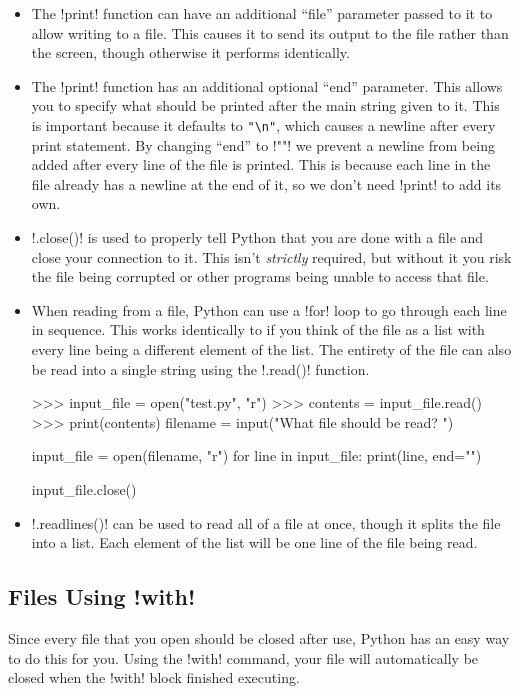 \documentclass[11pt]{cselabheader}
\begin{document}
\begin{itemize}
\item The \pythoninline!print! function can have an additional ``file'' parameter
  passed to it to allow writing to a file. This causes it to send its output to
  the file rather than the screen, though otherwise it performs identically.

\item The \pythoninline!print! function has an additional optional ``end''
  parameter. This allows you to specify what should be printed after the main
  string given to it. This is important because it defaults to \lstinline{"\n"},
  which causes a newline after every print statement. By changing ``end'' to
  \pythoninline!""! we prevent a newline from being added after every line of the
  file is printed. This is because each line in the file already has a newline
  at the end of it, so we don't need \pythoninline!print! to add its own.

\item \pythoninline!.close()! is used to properly tell Python that you are done
  with a file and close your connection to it. This isn't \emph{strictly}
  required, but without it you risk the file being corrupted or other programs
  being unable to access that file.

\item When reading from a file, Python can use a \pythoninline!for! loop to go
  through each line in sequence. This works identically to if you think of the
  file as a list with every line being a different element of the list. The
  entirety of the file can also be read into a single string using the
  \pythoninline!.read()! function.

\begin{pyconcode}
>>> input_file = open("test.py", "r")
>>> contents = input_file.read()
>>> print(contents)
filename = input("What file should be read? ")

input_file = open(filename, "r")
for line in input_file:
  print(line, end="")

input_file.close()
\end{pyconcode}

\item \pythoninline!.readlines()! can be used to read all of a file at once, though
  it splits the file into a list. Each element of the list will be one line of
  the file being read.
\end{itemize}

\subsection{Files Using \pythoninline!with!}
Since every file that you open should be closed after use, Python has an easy way to do this for you. Using the \pythoninline!with! command, your file will automatically be closed when the \pythoninline!with! block finished executing.
\end{document}
